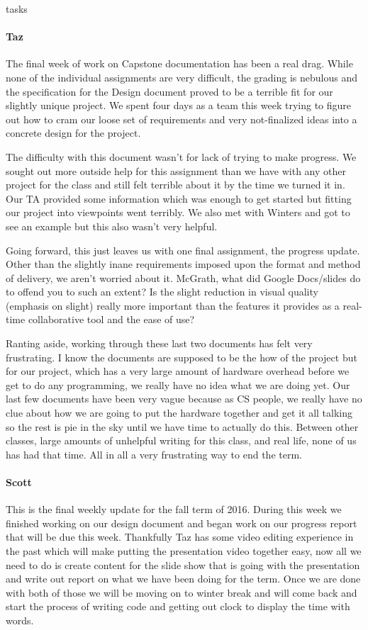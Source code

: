 tasks\documentclass[onecolumn, draftclsnofoot,10pt, compsoc]{IEEEtran}
\begin{document}
\paragraph{Taz}
The final week of work on Capstone documentation has been a real drag. While none of the individual assignments are very difficult, the grading is nebulous and the specification for the Design document proved to be a terrible fit for our slightly unique project. We spent four days as a team this week trying to figure out how to cram our loose set of requirements and very not-finalized ideas into a concrete design for the project.

The difficulty with this document wasn't for lack of trying to make progress. We sought out more outside help for this assignment than we have with any other project for the class and still felt terrible about it by the time we turned it in. Our TA provided some information which was enough to get started but fitting our project into viewpoints went terribly. We also met with Winters and got to see an example but this also wasn't very helpful.

Going forward, this just leaves us with one final assignment, the progress update. Other than the slightly inane requirements imposed upon the format and method of delivery, we aren't worried about it. McGrath, what did Google Docs/slides do to offend you to such an extent? Is the slight reduction in visual quality (emphasis on slight) really more important than the features it provides as a real-time collaborative tool and the ease of use?

Ranting aside, working through these last two documents has felt very frustrating. I know the documents are supposed to be the how of the project but for our project, which has a very large amount of hardware overhead before we get to do any programming, we really have no idea what we are doing yet. Our last few documents have been very vague because as CS people, we really have no clue about how we are going to put the hardware together and get it all talking so the rest is pie in the sky until we have time to actually do this. Between other classes, large amounts of unhelpful writing for this class, and real life, none of us has had that time. All in all a very frustrating way to end the term.
\paragraph{Scott}
This is the final weekly update for the fall term of 2016. During this week we finished working on our design document and began work on our progress report that will be due this week. Thankfully Taz has some video editing experience in the past which will make putting the presentation video together easy, now all we need to do is create content for the slide show that is going with the presentation and write out report on what we have been doing for the term. Once we are done with both of those we will be moving on to winter break and will come back and start the process of writing code and getting out clock to display the time with words.
\end{document}

